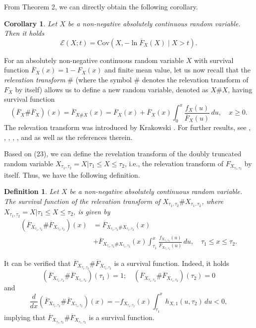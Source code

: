 \documentclass[11pt]{article}
\newtheorem{corollary}{Corollary}
\newtheorem{definition}{Definition}
\begin{document}
From Theorem 2, we can directly obtain the following corollary.
\begin{corollary}
	Let $X$ be a non-negative absolutely continuous random variable. Then it holds
	$$ \textstyle \mathcal{E}(X;t) = \mathrm{Cov}(X, -\ln \overline{F}_X(X) \mid X > t). $$
\end{corollary} 

For an absolutely non-negative continuous random variable $X$ with survival function $\overline{F}_X(x)=1-F_X(x)$ and finite mean value, let us now recall that the \textit{relevation transform} \# (where the symbol \# denotes the relevation transform of $F_X$ by itself) allows us to define a new random variable, denoted as $X\# X$, having survival function 
\begin{equation} \textstyle 
	(\overline{F}_X\# \overline{F}_X)(x)=\overline{F}_{X\# X}(x)=\overline{F}_X(x)+\overline{F}_X(x)\int_0^x \frac{f_X(u)}{\overline{F}_X(u)}\,du,\quad x\geq 0.
\end{equation}
The relevation transform was introduced by Krakowski \cite{Krakowski1973}. For further results, see \cite{Baxter1982}, \cite{Kapodistria2012}, \cite{Psarrakos2013}, \cite{Burkschat2014}, \cite{DiCrescenzo2015}, and \cite{Psarrakos2018} as well as the references therein.

Based on (23), we can define the revelation transform of the doubly truncated random variable $X_{\tau_1,\tau_2}=X|\tau_1 \leq X \leq \tau_2$, i.e., the relevation transform of $F_{X_{\tau_1,\tau_2}}$ by itself. Thus, we have the following definition.
\begin{definition}
	Let $X$ be a non-negative absolutely continuous random variable. The survival function of the relevation transform of $X_{\tau_1,\tau_2}\# X_{\tau_1,\tau_2}$, where $X_{\tau_1,\tau_2}=X|\tau_1 \leq X \leq \tau_2$, is given by
	\begin{align}
		(\overline{F}_{X_{\tau_1,\tau_2}}\# \overline{F}_{X_{\tau_1,\tau_2}})(x) & \textstyle =\overline{F}_{X_{\tau_1,\tau_2}\# X_{\tau_1,\tau_2}}(x) \nonumber \\
		& \textstyle +\overline{F}_{X_{\tau_1,\tau_2}\# X_{\tau_1,\tau_2}}(x)\int_{\tau_1}^x \frac{f_{X_{\tau_1,\tau_2}}(u)}{\overline{F}_{X_{\tau_1,\tau_2}}(u)}\,du,\quad \tau_1\leq x\leq \tau_2.
	\end{align}
\end{definition}

It can be verified that $\overline{F}_{X_{\tau_1,\tau_2}}\# \overline{F}_{X_{\tau_1,\tau_2}}$ is a survival function. Indeed, it holds
$$ \textstyle (\overline{F}_{X_{\tau_1,\tau_2}}\# \overline{F}_{X_{\tau_1,\tau_2}})(\tau_1)=1;\quad (\overline{F}_{X_{\tau_1,\tau_2}}\# \overline{F}_{X_{\tau_1,\tau_2}})(\tau_2)=0 $$
and
$$ \textstyle \frac{d}{dx}(\overline{F}_{X_{\tau_1,\tau_2}}\# \overline{F}_{X_{\tau_1,\tau_2}})(x) = -f_{X_{\tau_1,\tau_2}}(x)\int_{\tau_1}^x h_{X,1}(u,\tau_2)\,du < 0, $$
implying that $\overline{F}_{X_{\tau_1,\tau_2}}\# \overline{F}_{X_{\tau_1,\tau_2}}$ is a survival function.
\end{document}
